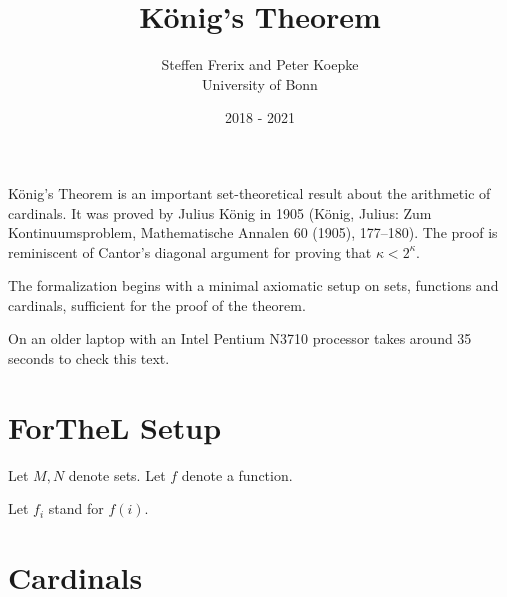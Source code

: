 \documentclass{article}
\title{König's Theorem}
\author{Steffen Frerix and Peter Koepke\\
University of Bonn}
\date{2018 - 2021}
\begin{document}
\maketitle

König's Theorem is an important set-theoretical result about the arithmetic of
cardinals.
It was proved by Julius König in 1905 (König, Julius: Zum Kontinuumsproblem,
Mathematische Annalen 60 (1905), 177–180).
The proof is reminiscent of Cantor's diagonal argument for proving that $\kappa
< 2^\kappa$.

The formalization begins with a minimal axiomatic setup on sets, functions and
cardinals, sufficient for the proof of the theorem.

On an older laptop with an Intel Pentium N3710 processor \Naproche takes around
35 seconds to check this text.


\section{ForTheL Setup}

\begin{forthel}

  Let $M, N$ denote sets.
  Let $f$ denote a function.

  Let $f_{i}$ stand for $f(i)$.
\end{forthel}


\section{Cardinals}
\end{document}
